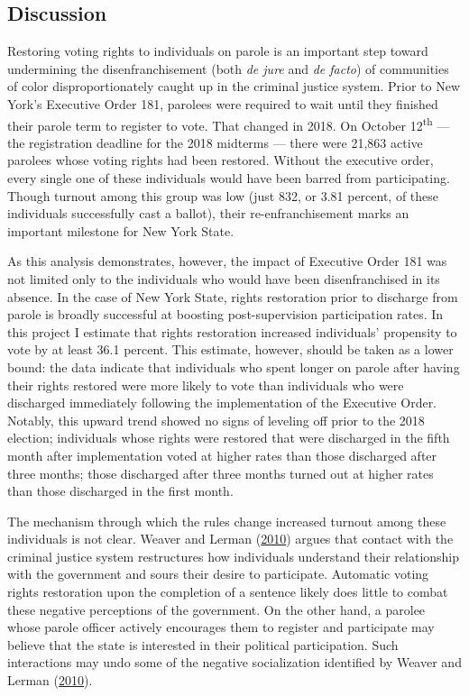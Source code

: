 \documentclass[
  12pt,
]{article}
\begin{document}
\hypertarget{discussion}{%
\subsection*{Discussion}\label{discussion}}

Restoring voting rights to individuals on parole is an important step toward undermining the disenfranchisement (both \emph{de jure} and \emph{de facto}) of communities of color disproportionately caught up in the criminal justice system. Prior to New York's Executive Order 181, parolees were required to wait until they finished their parole term to register to vote. That changed in 2018. On October 12\textsuperscript{th} --- the registration deadline for the 2018 midterms --- there were 21,863 active parolees whose voting rights had been restored. Without the executive order, every single one of these individuals would have been barred from participating. Though turnout among this group was low (just 832, or 3.81 percent, of these individuals successfully cast a ballot), their re-enfranchisement marks an important milestone for New York State.

As this analysis demonstrates, however, the impact of Executive Order 181 was not limited only to the individuals who would have been disenfranchised in its absence. In the case of New York State, rights restoration prior to discharge from parole is broadly successful at boosting post-supervision participation rates. In this project I estimate that rights restoration increased individuals' propensity to vote by at least 36.1 percent. This estimate, however, should be taken as a lower bound: the data indicate that individuals who spent longer on parole after having their rights restored were more likely to vote than individuals who were discharged immediately following the implementation of the Executive Order. Notably, this upward trend showed no signs of leveling off prior to the 2018 election; individuals whose rights were restored that were discharged in the fifth month after implementation voted at higher rates than those discharged after three months; those discharged after three months turned out at higher rates than those discharged in the first month.

The mechanism through which the rules change increased turnout among these individuals is not clear. Weaver and Lerman (\protect\hyperlink{ref-Weaver2010}{2010}) argues that contact with the criminal justice system restructures how individuals understand their relationship with the government and sours their desire to participate. Automatic voting rights restoration upon the completion of a sentence likely does little to combat these negative perceptions of the government. On the other hand, a parolee whose parole officer actively encourages them to register and participate may believe that the state is interested in their political participation. Such interactions may undo some of the negative socialization identified by Weaver and Lerman (\protect\hyperlink{ref-Weaver2010}{2010}).
\end{document}
